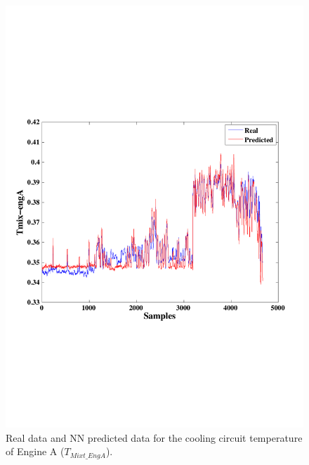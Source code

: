 \begin{figure}
\centering
\includegraphics[width=1\textwidth]{IrrigationA-ANN.pdf}
\caption{Real data and NN predicted data for the cooling circuit temperature of Engine A ($T_{Mixt\_EngA}$).}
\label{TcoolA}
\end{figure}

